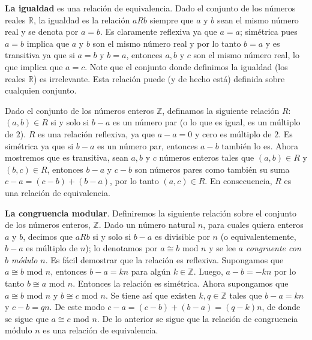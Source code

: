 \documentclass[12pt,]{krantz}
\theoremstyle{definition}
\theoremstyle{definition}
\theoremstyle{definition}
\theoremstyle{remark}
\let\BeginKnitrBlock\begin \let\EndKnitrBlock\end
\begin{document}
\BeginKnitrBlock{example}
\protect\hypertarget{exm:ejm1-9}{}{\label{exm:ejm1-9} }\textbf{La igualdad}
es una relación de equivalencia. Dado el conjunto de los números reales
\(\mathbb{R}\), la igualdad es la relación \(aRb\) siempre que \(a\) y
\(b\) sean el mismo número real y se denota por \(a=b\). Es claramente
reflexiva ya que \(a=a\); simétrica pues \(a=b\) implica que \(a\) y
\(b\) son el mismo número real y por lo tanto \(b=a\) y es transitiva ya
que si \(a=b\) y \(b=a\), entonces \(a,b\) y \(c\) son el mismo número
real, lo que implica que \(a=c\). Note que el conjunto donde definimos
la igualdad (los reales \(\mathbb{R}\)) es irrelevante. Esta relación
puede (y de hecho está) definida sobre cualquien conjunto.
\EndKnitrBlock{example}

\BeginKnitrBlock{example}
\protect\hypertarget{exm:ejm1-10}{}{\label{exm:ejm1-10} }Dado el conjunto de
los números enteros \(\mathbb{Z}\), definamos la siguiente relación
\(R\): \((a,b)\in R\) si y solo si \(b-a\) es un número par (o lo que es
igual, es un múltiplo de \(2\)). \(R\) es una relación reflexiva, ya que
\(a-a=0\) y cero es múltiplo de \(2\). Es simétrica ya que si \(b-a\) es
un número par, entonces \(a-b\) también lo es. Ahora mostremos que es
transitiva, sean \(a, b\) y \(c\) números enteros tales que
\((a,b)\in R\) y \((b,c)\in R\), entonces \(b-a\) y \(c-b\) son números
pares como también su suma \(c-a=(c-b)+(b-a)\), por lo tanto
\((a,c)\in R\). En consecuencia, \(R\) es una relación de equivalencia.
\EndKnitrBlock{example}

\BeginKnitrBlock{example}
\protect\hypertarget{exm:ejm1-11}{}{\label{exm:ejm1-11} }\textbf{La
congruencia modular}. Definiremos la siguiente relación sobre el
conjunto de los números enteros, \(\mathbb{Z}\). Dado un número natural
\(n\), para cuales quiera enteros \(a\) y \(b\), decimos que \(aRb\) si
y solo si \(b-a\) es divisible por \(n\) (o equivalentemente, \(b-a\) es
múltiplo de \(n\)); lo denotamos por \(a\cong b\mbox{ mod } n\) y se lee
\emph{\(a\) congruente con \(b\) módulo \(n\)}. Es fácil demostrar que
la relación es reflexiva. Supongamos que \(a\cong b \mbox{ mod } n\),
entonces \(b-a=kn\) para algún \(k\in\mathbb{Z}\). Luego, \(a-b=-kn\)
por lo tanto \(b\cong a \mbox{ mod } n\). Entonces la relación es
simétrica. Ahora supongamos que \(a\cong b \mbox{ mod } n\) y
\(b\cong c \mbox{ mod } n\). Se tiene así que existen
\(k,q\in\mathbb{Z}\) tales que \(b-a=kn\) y \(c-b=qn\). De este modo
\(c-a=(c-b)+(b-a)=(q-k)n\), de donde se sigue que
\(a\cong c \mbox{ mod } n\). De lo anterior se sigue que la relación de
congruencia módulo \(n\) es una relación de equivalencia.
\EndKnitrBlock{example}
\end{document}
